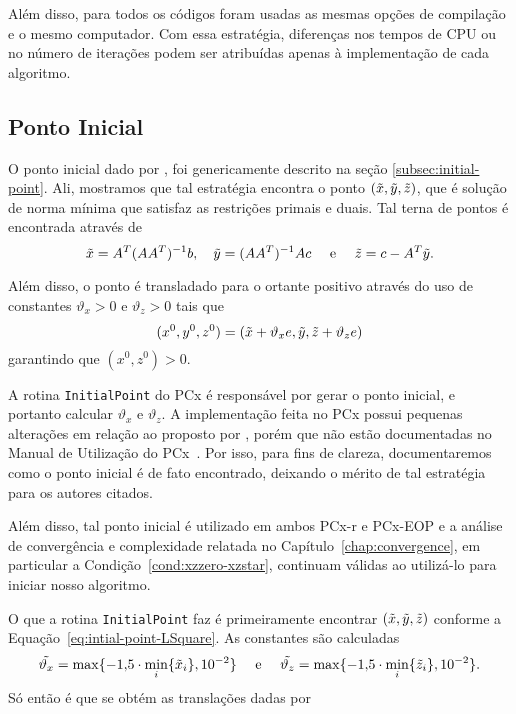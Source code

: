 Além disso, para todos os códigos foram usadas as mesmas opções de compilação e o mesmo computador. Com essa estratégia, diferenças nos tempos de CPU ou no número de iterações podem ser atribuídas apenas à implementação de cada algoritmo.
\subsection{Ponto Inicial}

O ponto inicial dado por \textcite{Mehrotra:1992wr}, foi genericamente descrito na seção \ref{subsec:initial-point}. Ali, mostramos que tal estratégia encontra o ponto $(\tilde{x},\tilde{y},\tilde{z})$, que é solução de norma mínima que satisfaz as restrições primais e
duais. Tal terna de pontos é encontrada através de
\begin{equation}
	\label{eq:intial-point-LSquare}
	\tilde{x} = A^T(AA^T)^{-1}b, \quad \tilde{y} = (AA^T)^{-1}Ac\quad \text{ e }
\quad \tilde{z} = c - A^T\tilde{y}.
\end{equation}

Além disso, o ponto é transladado para o ortante positivo 
através do uso de constantes  $\vartheta_x>0$ e $\vartheta_ z>0$ tais que  
\begin{equation}
	\label{eq:intial-point-generated}
(x^0,y^0,z^0) = (\tilde{x}+ \vartheta_x e,\tilde{y},\tilde{z}+\vartheta_z e)
\end{equation}
garantindo que $(x^0,z^0)>0$.


 A rotina \verb|InitialPoint| do PCx é responsável por gerar o ponto inicial, e portanto calcular  $\vartheta_x$ e $\vartheta_ z$. A implementação feita no PCx possui  pequenas alterações em relação ao proposto por \citeauthor{Mehrotra:1992wr}, porém que não  estão documentadas no Manual de Utilização do PCx~\cite{Czyzyk:1998vw}. Por isso, para fins de clareza, documentaremos como o ponto inicial é de fato encontrado, deixando o mérito de tal estratégia para os autores citados.

  Além disso, tal ponto inicial é utilizado em ambos PCx-r e PCx-EOP e a análise de convergência e complexidade relatada no Capítulo~\ref{chap:convergence}, em particular a Condição~\ref{cond:xzzero-xzstar}, continuam válidas ao utilizá-lo para iniciar nosso algoritmo.

O que a rotina  \verb|InitialPoint| faz é primeiramente encontrar  $(\tilde{x},\tilde{y},\tilde{z})$ conforme a Equação~\eqref{eq:intial-point-LSquare}. As constantes são calculadas
\begin{equation}
	\label{eq:initial-point-tilde-var}
\tilde{\vartheta_x} = \max\{\displaystyle\num{-1.5}\cdot\min_{i}\{\tilde{x}_{i}\},\num{e-2}\} \quad \text{ e }\quad  \tilde{\vartheta_z} = \max\{\displaystyle\num{-1.5}\cdot\min_{i}\{\tilde{z}_{i}\},\num{e-2}\}.
\end{equation}
Só então é que se obtém as translações dadas por 

